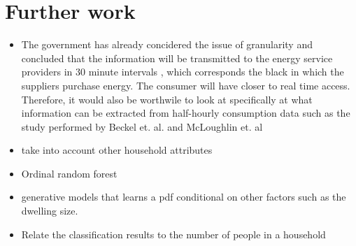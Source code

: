 \chapter{Further work}
\begin{itemize}
\item The government has already concidered the issue of granularity and concluded that the information will be transmitted to the energy service providers in 30 minute intervals \cite{DECC_1}, which corresponds the black in which the suppliers purchase energy. The consumer will have closer to real time access. Therefore, it would also be worthwile to look at specifically at what information can be extracted from half-hourly consumption data such as the study performed by Beckel et. al. and McLoughlin et. al \citep{Beckel_2,McLouchlin}
\item take into account other household attributes
\item Ordinal random forest
\item generative models that learns a pdf conditional on other factors such as the dwelling size.
\item Relate the classification results to the number of people in a household
\end{itemize}